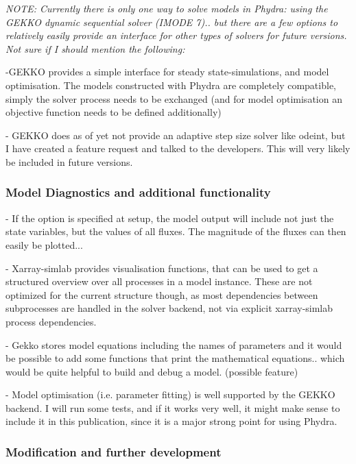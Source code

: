 \documentclass[journal abbreviations, manuscript]{copernicus}
\begin{document}
\textit{NOTE: Currently there is only one way to solve models in Phydra: using the GEKKO dynamic sequential solver (IMODE 7).. but there are a few options to relatively easily provide an interface for other types of solvers for future versions. Not sure if I should mention the following:}

-GEKKO provides a simple interface for steady state-simulations, and model optimisation. The models constructed with Phydra are completely compatible, simply the solver process needs to be exchanged (and for model optimisation an objective function needs to be defined additionally)

- GEKKO does as of yet not provide an adaptive step size solver like odeint, but I have created a feature request and talked to the developers. This will very likely be included in future versions.




\subsubsection{Model Diagnostics and additional functionality}

- If the option is specified at setup, the model output will include not just the state variables, but the values of all fluxes. The magnitude of the fluxes can then easily be plotted...

- Xarray-simlab provides visualisation functions, that can be used to get a structured overview over all processes in a model instance. These are not optimized for the current structure though, as most dependencies between subprocesses are handled in the solver backend, not via explicit xarray-simlab process dependencies.

- Gekko stores model equations including the names of parameters and it would be possible to add some functions that print the mathematical equations.. which would be quite helpful to build and debug a model. (possible feature)

- Model optimisation (i.e. parameter fitting) is well supported by the GEKKO backend. I will run some tests, and if it works very well, it might make sense to include it in this publication, since it is a major strong point for using Phydra.


\subsubsection{Modification and further development}
\end{document}
